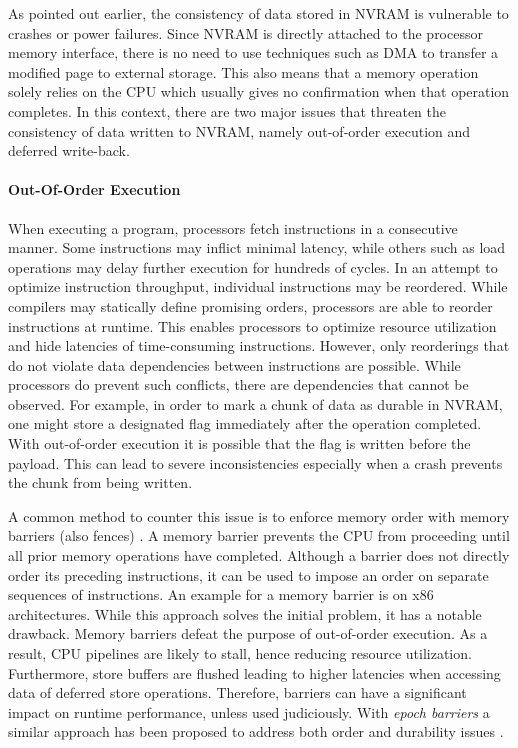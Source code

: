 As pointed out earlier, the consistency of data stored in \ac{NVRAM} is
vulnerable to crashes or power failures. Since \ac{NVRAM} is directly attached
to the processor memory interface, there is no need to use techniques such as
\ac{DMA} to transfer a modified page to external storage. This also means that a
memory operation solely relies on the \ac{CPU} which usually gives no
confirmation when that operation completes. In this context, there are two major
issues that threaten the consistency of data written to \ac{NVRAM}, namely
out-of-order execution and deferred write-back.

\paragraph{Out-Of-Order Execution}

When executing a program, processors fetch instructions in a consecutive manner.
Some instructions may inflict minimal latency, while others such as load
operations may delay further execution for hundreds of cycles. In an attempt to
optimize instruction throughput, individual instructions may be reordered. While
compilers may statically define promising orders, processors are able to reorder
instructions at runtime. This enables processors to optimize resource
utilization and hide latencies of time-consuming instructions. However, only
reorderings that do not violate data dependencies between instructions are
possible. While processors do prevent such conflicts, there are dependencies
that cannot be observed. For example, in order to mark a chunk of data as
durable in \ac{NVRAM}, one might store a designated flag immediately after the
operation completed. With out-of-order execution it is possible that the flag is
written before the payload. This can lead to severe inconsistencies especially
when a crash prevents the chunk from being written.

A common method to counter this issue is to enforce memory order with memory
barriers (also fences) \cite{dulloor2014system, schwalb2016hyrise,
oukid2017data}. A memory barrier prevents the \ac{CPU} from proceeding until all
prior memory operations have completed. Although a barrier does not directly
order its preceding instructions, it can be used to impose an order on separate
sequences of instructions. An example for a memory barrier is  on
x86 architectures. While this approach solves the initial problem, it has a
notable drawback. Memory barriers defeat the purpose of out-of-order execution.
As a result, \ac{CPU} pipelines are likely to stall, hence reducing resource
utilization. Furthermore, store buffers are flushed leading to higher latencies
when accessing data of deferred store operations. Therefore, barriers can have a
significant impact on runtime performance, unless used judiciously. With
\emph{epoch barriers} a similar approach has been proposed to address both order
and durability issues \cite{condit2009better}.

